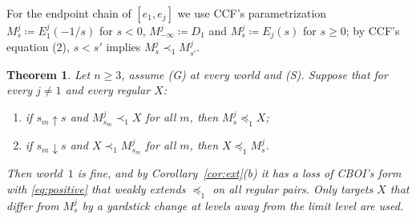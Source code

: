 \documentclass[11pt]{article}
\newtheorem{theorem}{Theorem}
\theoremstyle{definition}\newtheorem{definition}[theorem]{Definition}
\theoremstyle{remark}\newtheorem{remark}[theorem]{Remark}
\begin{document}
For the endpoint chain of $[e_1,e_j]$ we use CCF's parametrization
$M^j_s\coloneqq E^j_1(-1/s)$ for $s<0$, $M^j_{-\infty}\coloneqq D_1$ and
$M^j_s\coloneqq E_j(s)$ for $s\ge0$; by CCF's equation (2),
$s<s'$ implies $M^j_s\prec_1M^j_{s'}$.

\begin{theorem}\label{thm:ECC}
Let $n\ge3$, assume (G) at every world and (S). Suppose that for every
$j\ne1$ and every regular $X$:
\begin{enumerate}[label=(ECC-\alph*),leftmargin=*]
\item if $s_m\uparrow s$ and $M^j_{s_m}\prec_1X$ for all $m$, then
$M^j_s\preceq_1X$;
\item if $s_m\downarrow s$ and $X\prec_1M^j_{s_m}$ for all $m$, then
$X\preceq_1M^j_s$.
\end{enumerate}
Then world~$1$ is fine, and by Corollary~\ref{cor:ext}(b) it has a loss of
CBOI's form with \eqref{eq:positive} that weakly extends $\preceq_1$ on all
regular pairs. Only targets $X$ that differ from $M^j_s$ by a yardstick
change at levels away from the limit level are used.
\end{theorem}
\end{document}
